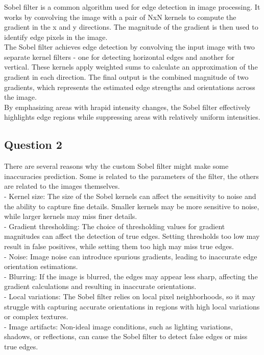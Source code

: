 \documentclass[12pt]{article}
\begin{document}
\subsubsection{}
\quad Sobel filter is a common algorithm used for edge detection in image processing. It works by convolving the image with a pair of NxN kernels to compute the gradient in the x and y directions. The magnitude of the gradient is then used to identify edge pixels in the image.\\
The Sobel filter achieves edge detection by convolving the input image with two separate kernel filters - one for detecting horizontal edges and another for vertical. These kernels apply weighted sums to calculate an approximation of the gradient in each direction. The final output is the combined magnitude of two gradients, which represents the estimated edge strengths and orientations across the image.\\
By emphasizing areas with hrapid intensity changes, the Sobel filter effectively highlights edge regions while suppressing areas with relatively uniform intensities.
\subsection{Question 2}

\quad There are several reasons why the custom Sobel filter might make some inaccuracies prediction. Some is related to the parameters of the filter, the others are related to the images themselves.\\
- Kernel size: The size of the Sobel kernels can affect the sensitivity to noise and the ability to capture fine details. Smaller kernels may be more sensitive to noise, while larger kernels may miss finer details.\\
- Gradient thresholding: The choice of thresholding values for gradient magnitudes can affect the detection of true edges. Setting thresholds too low may result in false positives, while setting them too high may miss true edges.\\
- Noise: Image noise can introduce spurious gradients, leading to inaccurate edge orientation estimations.\\
- Blurring: If the image is blurred, the edges may appear less sharp, affecting the gradient calculations and resulting in inaccurate orientations.\\
- Local variations: The Sobel filter relies on local pixel neighborhoods, so it may struggle with capturing accurate orientations in regions with high local variations or complex textures.\\
- Image artifacts: Non-ideal image conditions, such as lighting variations, shadows, or reflections, can cause the Sobel filter to detect false edges or miss true edges.\\
\end{document}
